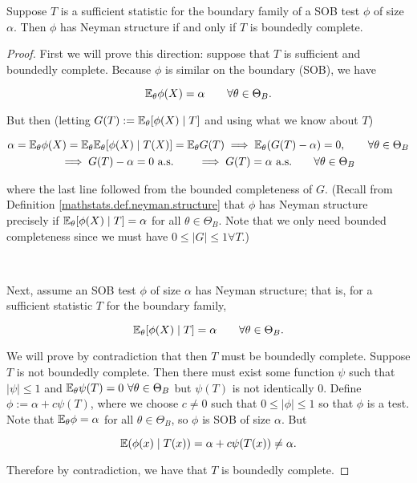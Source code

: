 \begin{theorem}\label{mathstats.neyman.structure.thm.neym.struc.comp}

Suppose \(T\) is a sufficient statistic for the boundary family of a SOB test \(\phi\) of size \(\alpha\). Then \(\phi\) has Neyman structure if and only if \(T\) is boundedly complete.

\end{theorem}

\begin{proof}

First we will prove this direction: suppose that \(T\) is sufficient and boundedly complete. Because \(\phi\) is similar on the boundary (SOB), we have

\[
\E_\theta \phi(X) = \alpha \qquad \forall \theta \in \Theta_B.
\]

But then (letting \(G(T) := \E_\theta[\phi(X) \mid T] \) and using what we know about \(T\))

\begin{multline*}
\alpha = \E_\theta \phi(X) = \E_\theta \E_\theta[\phi(X) \mid T(X)] = \E_\theta G(T)  \implies \E_\theta(G(T) - \alpha) = 0 , \qquad \forall \theta \in \Theta_B
\\ \implies G(T) - \alpha = 0 \text{ a.s.}  \qquad \implies G(T) = \alpha \text { a.s.} \qquad \forall \theta \in \Theta_B
\end{multline*}

where the last line followed from the bounded completeness of \(G\). (Recall from Definition \ref{mathstats.def.neyman.structure} that \(\phi\) has Neyman structure precisely if \(\E_\theta[\phi(X) \mid T] = \alpha\) for all \(\theta \in \Theta_B\). Note that we only need bounded completeness since we must have \(0 \leq |G| \leq 1 \forall T\).) 

\

Next, assume an SOB test \(\phi\) of size \(\alpha\) has Neyman structure; that is, for a sufficient statistic \(T\) for the boundary family,

\[
\E_\theta[\phi(X) \mid T] = \alpha \qquad \forall \theta \in \Theta_B.
\]

We will prove by contradiction that then \(T\) must be boundedly complete. Suppose \(T\) is not boundedly complete. Then there must exist some function \(\psi\) such that \(|\psi| \leq 1\) and \(\E_\theta \psi(T) = 0 \ \forall \theta \in \Theta_B\) but \(\psi(T)\) is not identically 0. Define \(\phi := \alpha + c \psi(T)\), where we choose \(c \neq 0 \) such that \( 0 \leq |\phi | \leq 1\) so that \(\phi\) is a test. Note that \(\E_\theta \phi = \alpha\) for all \(\theta \in \Theta_B\), so \(\phi\) is SOB of size \(\alpha\). But

\[
\E( \phi(x) \mid T(x) ) = \alpha + c \psi(T(x)) \neq \alpha.
\]

Therefore by contradiction, we have that \(T\) is boundedly complete.

\end{proof}


